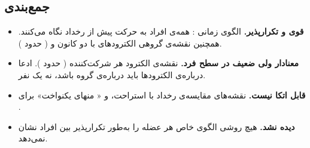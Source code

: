 \subsection{جمع‌بندی}

\begin{itemize}
\item \textbf{قوی و تکرارپذیر.} الگوی زمانی : همه‌ی افراد به حرکت پیش از رخداد نگاه می‌کنند. همچنین نقشه‌ی گروهی الکترودهای  با دو کانون  و  ( حدود ).
\item \textbf{معنادار ولی ضعیف در سطح فرد.} نقشه‌ی الکترود هر شرکت‌کننده ( حدود ). ادعا درباره‌ی الکترودها باید درباره‌ی گروه باشد، نه یک نفر.
\item \textbf{قابل اتکا نیست.} نقشه‌های مقایسه‌ی رخداد با استراحت، و « منهای یکنواخت» برای .
\item \textbf{دیده نشد.} هیچ روشی الگوی خاص هر عضله را به‌طور تکرارپذیر بین افراد نشان نمی‌دهد.
\end{itemize}
